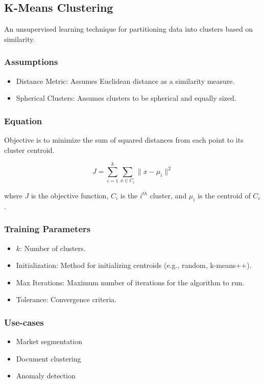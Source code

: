 \documentclass[english]{latex4ei/latex4ei_sheet}
\begin{document}
\begin{sectionbox}
\subsection{K-Means Clustering}
An unsupervised learning technique for partitioning data into clusters based on similarity.

\subsubsection{Assumptions}
\begin{itemize}
    \item Distance Metric: Assumes Euclidean distance as a similarity measure.
    \item Spherical Clusters: Assumes clusters to be spherical and equally sized.
\end{itemize}

\subsubsection{Equation}
Objective is to minimize the sum of squared distances from each point to its cluster centroid.

\[
J = \sum_{i=1}^{k} \sum_{x \in C_i} \|x - \mu_i\|^2
\]

where \(J\) is the objective function, \(C_i\) is the \(i^{th}\) cluster, and \(\mu_i\) is the centroid of \(C_i\).

\subsubsection{Training Parameters}
\begin{itemize}
    \item \( k \): Number of clusters.
    \item Initialization: Method for initializing centroids (e.g., random, k-means++).
    \item Max Iterations: Maximum number of iterations for the algorithm to run.
    \item Tolerance: Convergence criteria.
\end{itemize}

\subsubsection{Use-cases}
\begin{itemize}
    \item Market segmentation
    \item Document clustering
    \item Anomaly detection
\end{itemize}


\end{sectionbox}
\end{document}
